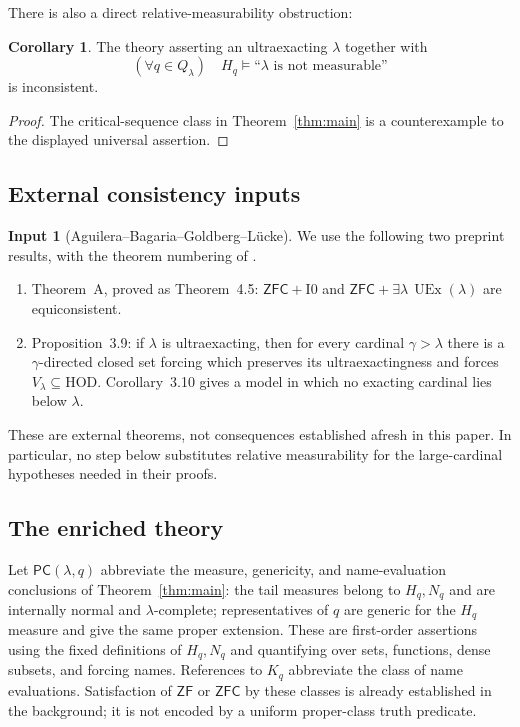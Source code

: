 \documentclass[11pt,letterpaper]{article}
\theoremstyle{definition}
\newtheorem{corollary}[definition]{Corollary}
\newtheorem{inputthm}{Input}
\numberwithin{equation}{section}
\newcommand{\ZFC}{\mathsf{ZFC}}
\newcommand{\ZF}{\mathsf{ZF}}
\newcommand{\HOD}{\mathrm{HOD}}
\newcommand{\UEx}{\operatorname{UEx}}
\newcommand{\Izero}{\mathrm{I0}}
\newcommand{\PC}{\mathsf{PC}}
\begin{document}
There is also a direct relative-measurability obstruction:
\begin{corollary}\label{cor:nonmeas}
The theory asserting an ultraexacting $\lambda$ together with
\[
 (\forall q\in Q_\lambda)\quad
 H_q\models\text{``$\lambda$ is not measurable''}
\]
is inconsistent.
\end{corollary}
\begin{proof}
The critical-sequence class in Theorem~\ref{thm:main} is a counterexample to the displayed universal assertion.
\end{proof}

\subsection{External consistency inputs}

\begin{inputthm}[Aguilera--Bagaria--Goldberg--L\"ucke]\label{input:abgl}
We use the following two preprint results, with the theorem numbering of \cite{abgl}.
\begin{enumerate}
\item Theorem~A, proved as Theorem~4.5: $\ZFC+\Izero$ and $\ZFC+\exists\lambda\,\UEx(\lambda)$ are equiconsistent.
\item Proposition~3.9: if $\lambda$ is ultraexacting, then for every cardinal $\gamma>\lambda$ there is a $\gamma$-directed closed set forcing which preserves its ultraexactingness and forces $V_\lambda\subseteq\HOD$. Corollary~3.10 gives a model in which no exacting cardinal lies below $\lambda$.
\end{enumerate}
\end{inputthm}

These are external theorems, not consequences established afresh in this paper. In particular, no step below substitutes relative measurability for the large-cardinal hypotheses needed in their proofs.

\subsection{The enriched theory}

Let $\PC(\lambda,q)$ abbreviate the measure, genericity, and name-evaluation conclusions of Theorem~\ref{thm:main}: the tail measures belong to $H_q,N_q$ and are internally normal and $\lambda$-complete; representatives of $q$ are generic for the $H_q$ measure and give the same proper extension. These are first-order assertions using the fixed definitions of $H_q,N_q$ and quantifying over sets, functions, dense subsets, and forcing names. References to $K_q$ abbreviate the class of name evaluations. Satisfaction of $\ZF$ or $\ZFC$ by these classes is already established in the background; it is not encoded by a uniform proper-class truth predicate.
\end{document}

